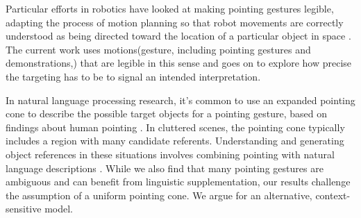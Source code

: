\documentclass[letterpaper]{article} %
\begin{document}
Particular efforts in robotics have looked at making pointing gestures legible, adapting the process of motion planning so that robot movements are correctly understood as being directed toward the location of a particular object in space \cite{holladay2014legible,zhao2016experimental}.  The current work uses motions(gesture, including pointing gestures and demonstrations,) that are legible in this sense and goes on to explore how precise the targeting has to be to signal an intended interpretation.




In natural language processing research, it's common to use an expanded pointing cone to describe the possible target objects for a pointing gesture, based on findings about human pointing \cite{kranstedt2003deixis,rieser2004pointing}. In cluttered scenes, the pointing cone typically includes a region with many candidate referents.  Understanding and generating object references in these situations involves combining pointing with natural language descriptions \cite{han2018placing,kollar2014grounding}.  While we also find that many pointing gestures are ambiguous and can benefit from linguistic supplementation, our results challenge the assumption of a uniform pointing cone. We argue for an alternative, context-sensitive model.
\end{document}
